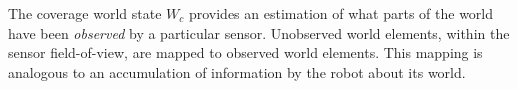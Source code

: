 \documentclass[letterpaper]{article} %
\newcommand{\ph}[1]{{\textbf{#1}:}} %
\begin{document}
The coverage world state $W_{c}$ provides an estimation of what parts of the world have been \textit{observed} by a particular sensor. Unobserved world elements, within the sensor field-of-view, are mapped to observed world elements. This mapping is analogous to an accumulation of information by the robot about its world. 
\end{document}
